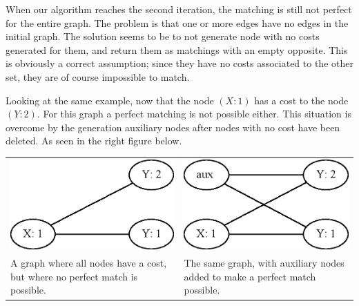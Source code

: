 \documentclass[11pt]{article}
\begin{document}
\endgroup

When our algorithm reaches the second iteration, the matching is still not perfect for the entire graph. The problem is that one or more edges have no edges in the initial graph. The solution seems to be to not generate node with no costs generated for them, and return them as matchings with an empty opposite. This is obviously a correct assumption; since they have no costs associated to the other set, they are of course impossible to match.

Looking at the same example, now that the node $(X: 1)$ has a cost to the node $(Y: 2)$. For this graph a perfect matching is not possible either. This situation is overcome by the generation auxiliary nodes after nodes with no cost have been deleted. As seen in the right figure below. \\

\begingroup
    \fontsize{7pt}{10pt}\selectfont
\begin{tabular}{ p{5.5cm} | p{5.5cm} }
   \centerline{\includegraphics[scale=0.3]{drawings/eps/TwoWayCostMatchingNotPerfect/NoFakeNode.eps}} &
    \centerline{\includegraphics[scale=0.3]{drawings/eps/TwoWayCostMatchingNotPerfect/FakeNode.eps}} \\
   A graph where all nodes have a cost, but where no perfect match is possible. &
    The same graph, with auxiliary nodes added to make a perfect match possible. \\ 
\end{tabular}
\end{document}
